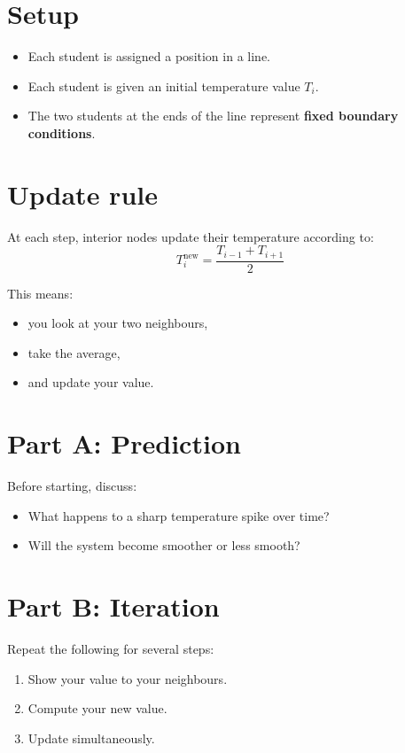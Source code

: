 \documentclass[11pt,a4paper]{article}
\begin{document}
\section*{Setup}

\begin{itemize}
    \item Each student is assigned a position in a line.
    \item Each student is given an initial temperature value $T_i$.
    \item The two students at the ends of the line represent \textbf{fixed
    boundary conditions}.
\end{itemize}

\section*{Update rule}
At each step, interior nodes update their temperature according to:
\begin{equation}
    T_i^{\text{new}} = \frac{T_{i-1} + T_{i+1}}{2}
\end{equation}

This means:
\begin{itemize}
    \item you look at your two neighbours,
    \item take the average,
    \item and update your value.
\end{itemize}

\section*{Part A: Prediction}

Before starting, discuss:
\begin{itemize}
    \item What happens to a sharp temperature spike over time?
    \item Will the system become smoother or less smooth?
\end{itemize}

\section*{Part B: Iteration}

Repeat the following for several steps:
\begin{enumerate}
    \item Show your value to your neighbours.
    \item Compute your new value.
    \item Update simultaneously.
\end{enumerate}
\end{document}
